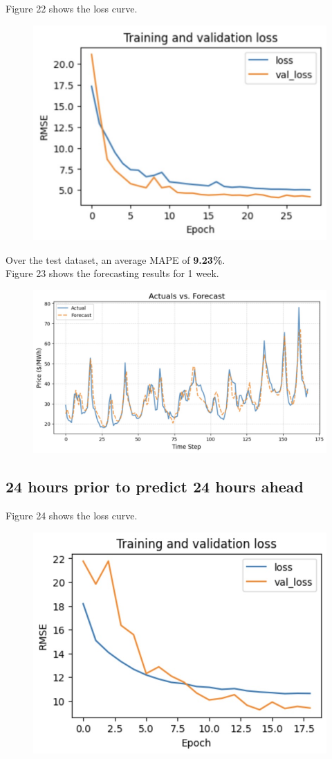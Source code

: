 \documentclass[9pt,a4paper,twoside]{rho}
\begin{document}
\noindent Figure 22 shows the loss curve.
\begin{figure}[H]
	\centering
	\includegraphics[width=0.8\columnwidth]{Figures/CNN-LSTM_24_1_Learning.png}
\end{figure}

\noindent Over the test dataset, an average MAPE of \textbf{9.23\%}.\\

\noindent Figure 23 shows the forecasting results for 1 week.
\begin{figure}[H]
	\centering
	\includegraphics[width=0.8\columnwidth]{Figures/CNN-LSTM_24_1_Results.png}
\end{figure}

\subsection*{24 hours prior to predict 24 hours ahead}


\noindent Figure 24 shows the loss curve.
\begin{figure}[H]
	\centering
	\includegraphics[width=0.8\columnwidth]{Figures/CNN-LSTM_24_24_Learning.png}
\end{figure}
\end{document}
